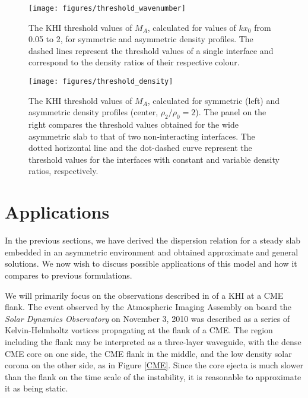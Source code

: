 \documentclass[12pt]{ociamthesis}
\begin{document}
\begin{figure}[!t]
\centering
\texttt{[image: figures/threshold\_wavenumber]}
\caption{The KHI threshold values of $M_A$, calculated for values of $k x_0$ from 0.05 to 2, for symmetric and asymmetric density profiles. The dashed lines represent the threshold values of a single interface and correspond to the density ratios of their respective colour.}
\label{fig:threshold_wavenumber}
\end{figure}

\begin{figure}[!t]
\centering
\texttt{[image: figures/threshold\_density]}
\caption{The KHI threshold values of $M_A$, calculated for symmetric (left) and asymmetric density profiles (center, $\rho_2/\rho_0=2$).
The panel on the right compares the threshold values obtained for the wide asymmetric slab to that of two non-interacting interfaces.
The dotted horizontal line and the dot-dashed curve represent the threshold values for the interfaces with constant and variable density ratios, respectively.}
\label{fig:threshold_density}
\end{figure}



\section{Applications}
\label{sec:c2app}

In the previous sections, we have derived the dispersion relation for a steady slab embedded in an asymmetric environment and obtained approximate and general solutions.
We now wish to discuss possible applications of this model and how it compares to previous formulations.

We will primarily focus on the observations described in \cite{Foullon2011} of a KHI at a CME flank.
The event observed by the Atmospheric Imaging Assembly on board the \textit{Solar Dynamics Observatory} on November 3, 2010 was described as a series of Kelvin-Helmholtz vortices propagating at the flank of a CME.
The region including the flank may be interpreted as a three-layer waveguide, with the dense CME core on one side, the CME flank in the middle, and the low density solar corona on the other side, as in Figure \ref{CME}.
Since the core ejecta is much slower than the flank on the time scale of the instability, it is reasonable to approximate it as being static.
\end{document}
